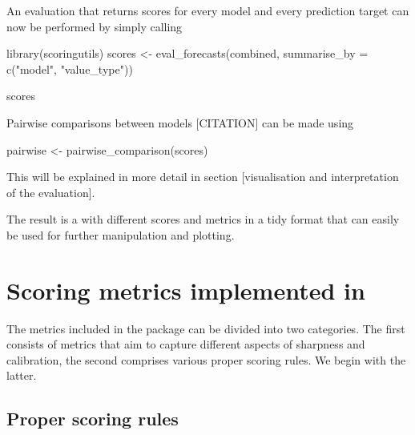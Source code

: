 \documentclass[article]{jss}
\begin{document}
An evaluation that returns scores for every model and every prediction target can now be performed by simply calling 
\begin{CodeInput}
library(scoringutils)
scores <- eval_forecasts(combined, 
                         summarise_by = c("model", "value_type"))
                         
scores
\end{CodeInput}

Pairwise comparisons between models [CITATION] can be made using 
\begin{CodeInput}
pairwise <- pairwise_comparison(scores)
\end{CodeInput}
This will be explained in more detail in section [visualisation and interpretation of the evaluation]. 

The result is a  with different scores and metrics in a tidy format that can easily be used for further manipulation and plotting. 

\section[metrics]{Scoring metrics implemented in }

The metrics included in the  package can be divided into two categories. The first consists of metrics that aim to capture different aspects of sharpness and calibration, the second comprises various proper scoring rules. We begin with the latter. 

\subsection{Proper scoring rules}
\end{document}
